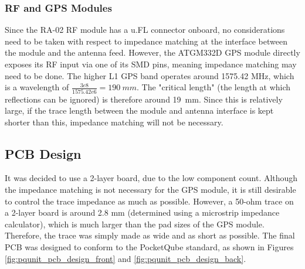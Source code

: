 \subsubsection{RF and GPS Modules}
Since the RA-02 RF module has a u.FL connector onboard, no considerations need to be taken with respect to impedance matching at the interface between the module and the antenna feed. However, the ATGM332D GPS module directly exposes its RF input via one of its SMD pins, meaning impedance matching may need to be done. The higher L1 GPS band operates around 1575.42 MHz, which is a wavelength of $\frac{3e8}{1575.42e6} = \SI{190}{mm}$. The "critical length" (the length at which reflections can be ignored) is therefore around \SI{19}{mm}. Since this is relatively large, if the trace length between the module and antenna interface is kept shorter than this, impedance matching will not be necessary.

\subsection{PCB Design}
It was decided to use a 2-layer board, due to the low component count. Although the impedance matching is not necessary for the GPS module, it is still desirable to control the trace impedance as much as possible. However, a 50-ohm trace on a 2-layer board is around 2.8 mm (determined using a microstrip impedance calculator), which is much larger than the pad sizes of the GPS module. Therefore, the trace was simply made as wide and as short as possible. The final PCB was designed to conform to the PocketQube standard, as shown in Figures \ref{fig:pqunit_pcb_design_front} and \ref{fig:pqunit_pcb_design_back}.

